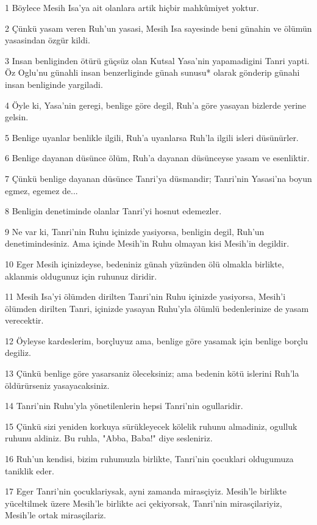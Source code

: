 \par 1 Böylece Mesih Isa'ya ait olanlara artik hiçbir mahkûmiyet yoktur.
\par 2 Çünkü yasam veren Ruh'un yasasi, Mesih Isa sayesinde beni günahin ve ölümün yasasindan özgür kildi.
\par 3 Insan benliginden ötürü güçsüz olan Kutsal Yasa'nin yapamadigini Tanri yapti. Öz Oglu'nu günahli insan benzerliginde günah sunusu* olarak gönderip günahi insan benliginde yargiladi.
\par 4 Öyle ki, Yasa'nin geregi, benlige göre degil, Ruh'a göre yasayan bizlerde yerine gelsin.
\par 5 Benlige uyanlar benlikle ilgili, Ruh'a uyanlarsa Ruh'la ilgili isleri düsünürler.
\par 6 Benlige dayanan düsünce ölüm, Ruh'a dayanan düsünceyse yasam ve esenliktir.
\par 7 Çünkü benlige dayanan düsünce Tanri'ya düsmandir; Tanri'nin Yasasi'na boyun egmez, egemez de...
\par 8 Benligin denetiminde olanlar Tanri'yi hosnut edemezler.
\par 9 Ne var ki, Tanri'nin Ruhu içinizde yasiyorsa, benligin degil, Ruh'un denetimindesiniz. Ama içinde Mesih'in Ruhu olmayan kisi Mesih'in degildir.
\par 10 Eger Mesih içinizdeyse, bedeniniz günah yüzünden ölü olmakla birlikte, aklanmis oldugunuz için ruhunuz diridir.
\par 11 Mesih Isa'yi ölümden dirilten Tanri'nin Ruhu içinizde yasiyorsa, Mesih'i ölümden dirilten Tanri, içinizde yasayan Ruhu'yla ölümlü bedenlerinize de yasam verecektir.
\par 12 Öyleyse kardeslerim, borçluyuz ama, benlige göre yasamak için benlige borçlu degiliz.
\par 13 Çünkü benlige göre yasarsaniz öleceksiniz; ama bedenin kötü islerini Ruh'la öldürürseniz yasayacaksiniz.
\par 14 Tanri'nin Ruhu'yla yönetilenlerin hepsi Tanri'nin ogullaridir.
\par 15 Çünkü sizi yeniden korkuya sürükleyecek kölelik ruhunu almadiniz, ogulluk ruhunu aldiniz. Bu ruhla, "Abba, Baba!" diye sesleniriz.
\par 16 Ruh'un kendisi, bizim ruhumuzla birlikte, Tanri'nin çocuklari oldugumuza taniklik eder.
\par 17 Eger Tanri'nin çocuklariysak, ayni zamanda mirasçiyiz. Mesih'le birlikte yüceltilmek üzere Mesih'le birlikte aci çekiyorsak, Tanri'nin mirasçilariyiz, Mesih'le ortak mirasçilariz.
